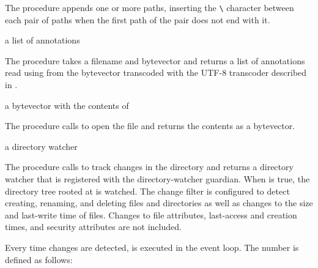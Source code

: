 The  procedure appends one or more paths,
inserting the \verb|\| character between each pair of paths when the
first path of the pair does not end with it.

\begin{procedure}
\end{procedure}
\returns{} a list of annotations

The  procedure takes a filename  and
 bytevector and returns a list of annotations read using
 from the  bytevector
transcoded with the UTF-8 transcoder described in
.

\begin{procedure}
\end{procedure}
\returns{} a bytevector with the contents of 

The  procedure calls  to open
the file  and returns the contents as a bytevector.

\begin{procedure}
\end{procedure}
\returns{} a directory watcher

The  procedure calls
 to track changes in the directory
 and returns a directory watcher that is registered with the
directory-watcher guardian. When
 is true, the directory tree rooted at  is
watched. The change filter is configured to detect creating, renaming,
and deleting files and directories as well as changes to the size and
last-write time of files. Changes to file attributes, last-access and
creation times, and security attributes are not included.

Every time changes are detected,  is executed in the event
loop. The  number is defined as follows:

